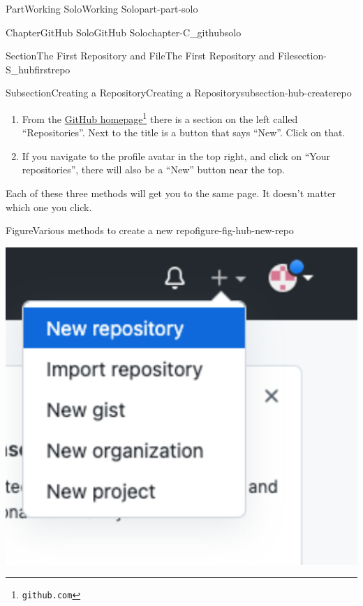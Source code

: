 \documentclass[oneside,10pt,]{book}
\begin{document}
\begin{partptx}{Part}{Working Solo}{}{Working Solo}{}{}{part-part-solo}
\begin{chapterptx}{Chapter}{GitHub Solo}{}{GitHub Solo}{}{}{chapter-C_githubsolo}
\begin{sectionptx}{Section}{The First Repository and File}{}{The First Repository and File}{}{}{section-S_hubfirstrepo}
\begin{subsectionptx}{Subsection}{Creating a Repository}{}{Creating a Repository}{}{}{subsection-hub-createrepo}
\begin{enumerate}
\par
Note: GitHub differentiates bewteen a repository and a project. Don't get confused. We want repository (and you will want that for most purposes).%
\item{}From the \href{https://github.com}{GitHub homepage}\footnote{\nolinkurl{github.com}\label{fn-hub-createrepo-c-b-b-a-b}} there is a section on the left called ``Repositories''. Next to the title is a button that says ``New''. Click on that.%
\item{}If you navigate to the profile avatar in the top right, and click on ``Your repositories'', there will also be a ``New'' button near the top.%
\end{enumerate}
Each of these three methods will get you to the same page. It doesn't matter which one you click.%
\begin{figureptx}{Figure}{Various methods to create a new repo}{figure-fig-hub-new-repo}{}%
\begin{sidebyside}{2}{0.025}{0.025}{0.05}%
\begin{sbspanel}{0.45}%
\includegraphics[width=\linewidth]{external/hub_new_repo_navbar.pdf}
\end{sbspanel}%
\begin{sbspanel}{0.45}%

\end{sbspanel}
\end{sidebyside}
\end{figureptx}
\end{subsectionptx}
\end{sectionptx}
\end{chapterptx}
\end{partptx}
\end{document}
